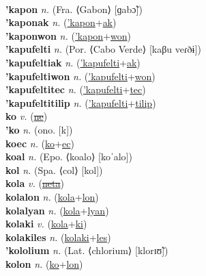  \label{kapeki} \\
\textbf{'kapon} \textit{n.} (Fra. ⟨Gabon⟩ [ɡabɔ̃])
 \label{'kapon} \\
\textbf{'kaponak} \textit{n.} (\hyperref['kapon]{'kapon}+\hyperref[ak]{ak})
 \label{'kaponak} \\
\textbf{'kaponwon} \textit{n.} (\hyperref['kapon]{'kapon}+\hyperref[won]{won})
 \label{'kaponwon} \\
\textbf{'kapufelti} \textit{n.} (Por. ⟨Cabo Verde⟩ [kaβu veɾðɨ])
 \label{'kapufelti} \\
\textbf{'kapufeltiak} \textit{n.} (\hyperref['kapufelti]{'kapufelti}+\hyperref[ak]{ak})
 \label{'kapufeltiak} \\
\textbf{'kapufeltiwon} \textit{n.} (\hyperref['kapufelti]{'kapufelti}+\hyperref[won]{won})
 \label{'kapufeltiwon} \\
\textbf{'kapufeltitec} \textit{n.} (\hyperref['kapufelti]{'kapufelti}+\hyperref[tec]{tec})
 \label{'kapufeltitec} \\
\textbf{'kapufeltitilip} \textit{n.} (\hyperref['kapufelti]{'kapufelti}+\hyperref[tilip]{tilip})
 \label{'kapufeltitilip} \\
\textbf{ko} \textit{v.} (\hyperref[ne]{\sout{ne}})
 \label{ko} \\
\textbf{'ko} \textit{n.} (ono. [k])
 \label{'ko} \\
\textbf{koec} \textit{n.} (\hyperref[ko]{ko}+\hyperref[ec]{ec})
 \label{koec} \\
\textbf{koal} \textit{n.} (Epo. ⟨koalo⟩ [koˈalo])
 \label{koal} \\
\textbf{kol} \textit{n.} (Spa. ⟨col⟩ [kol])
 \label{kol} \\
\textbf{kola} \textit{v.} (\hyperref[neta]{\sout{neta}})
 \label{kola} \\
\textbf{kolalon} \textit{n.} (\hyperref[kola]{kola}+\hyperref[lon]{lon})
 \label{kolalon} \\
\textbf{kolalyan} \textit{n.} (\hyperref[kola]{kola}+\hyperref[lyan]{lyan})
 \label{kolalyan} \\
\textbf{kolaki} \textit{v.} (\hyperref[kola]{kola}+\hyperref[ki]{ki})
 \label{kolaki} \\
\textbf{kolakiles} \textit{n.} (\hyperref[kolaki]{kolaki}+\hyperref[les]{les})
 \label{kolakiles} \\
\textbf{'kololium} \textit{n.} (Lat. ⟨chlorium⟩ [klorɪʊ̃])
 \label{'kololium} \\
\textbf{kolon} \textit{n.} (\hyperref[ko]{ko}+\hyperref[lon]{lon})
 \label{kolon} \\
